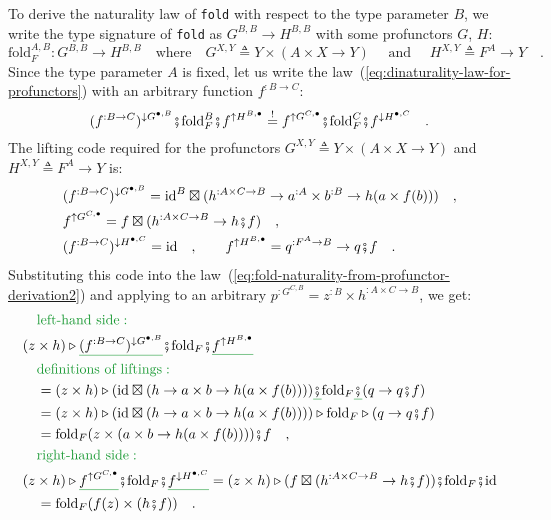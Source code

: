 To derive the naturality law of \lstinline!fold! with respect to
the type parameter $B$, we write the type signature of \lstinline!fold!
as $G^{B,B}\rightarrow H^{B,B}$ with some profunctors $G$, $H$:
\[
\text{fold}_{F}^{A,B}:G^{B,B}\rightarrow H^{B,B}\quad\text{where}\quad G^{X,Y}\triangleq Y\times(A\times X\rightarrow Y)\quad\text{ and }\quad H^{X,Y}\triangleq F^{A}\rightarrow Y\quad.
\]
Since the type parameter $A$ is fixed, let us write the law~(\ref{eq:dinaturality-law-for-profunctors})
with an arbitrary function $f^{:B\rightarrow C}$:
\begin{equation}
(f^{:B\rightarrow C})^{\downarrow G^{\bullet,B}}\bef\text{fold}_{F}^{B}\bef f^{\uparrow H^{B,\bullet}}\overset{!}{=}f^{\uparrow G^{C,\bullet}}\bef\text{fold}_{F}^{C}\bef f^{\downarrow H^{\bullet,C}}\quad.\label{eq:fold-naturality-from-profunctor-derivation2}
\end{equation}
The lifting code required for the profunctors $G^{X,Y}\triangleq Y\times\left(A\times X\rightarrow Y\right)$
and $H^{X,Y}\triangleq F^{A}\rightarrow Y$ is:
\begin{align*}
 & (f^{:B\rightarrow C})^{\downarrow G^{\bullet,B}}=\text{id}^{B}\boxtimes(h^{:A\times C\rightarrow B}\rightarrow a^{:A}\times b^{:B}\rightarrow h(a\times f(b)))\quad,\\
 & f^{\uparrow G^{C,\bullet}}=f\boxtimes(h^{:A\times C\rightarrow B}\rightarrow h\bef f)\quad,\\
 & (f^{:B\rightarrow C})^{\downarrow H^{\bullet,C}}=\text{id}\quad,\quad\quad f^{\uparrow H^{B,\bullet}}=q^{:F^{A}\rightarrow B}\rightarrow q\bef f\quad.
\end{align*}
Substituting this code into the law~(\ref{eq:fold-naturality-from-profunctor-derivation2})
and applying to an arbitrary $p^{:G^{C,B}}=z^{:B}\times h^{:A\times C\rightarrow B}$,
we get:
\begin{align*}
 & \quad{\color{greenunder}\text{left-hand side}:}\quad\\
 & (z\times h)\triangleright\gunderline{(f^{:B\rightarrow C})^{\downarrow G^{\bullet,B}}}\bef\text{fold}_{F}\bef\gunderline{f^{\uparrow H^{B,\bullet}}}\\
 & \quad{\color{greenunder}\text{definitions of liftings}:}\quad\\
 & \quad=(z\times h)\triangleright(\text{id}\boxtimes(h\rightarrow a\times b\rightarrow h(a\times f(b))))\gunderline{\bef}\text{fold}_{F}\gunderline{\bef}(q\rightarrow q\bef f)\\
 & \quad=(z\times h)\triangleright(\text{id}\boxtimes(h\rightarrow a\times b\rightarrow h(a\times f(b))))\triangleright\text{fold}_{F}\triangleright(q\rightarrow q\bef f)\\
 & \quad=\text{fold}_{F}(z\times(a\times b\rightarrow h(a\times f(b))))\bef f\quad,\\
 & \quad{\color{greenunder}\text{right-hand side}:}\quad\\
 & (z\times h)\triangleright\gunderline{f^{\uparrow G^{C,\bullet}}}\bef\text{fold}_{F}\bef\gunderline{f^{\downarrow H^{\bullet,C}}}=(z\times h)\triangleright(f\boxtimes(h^{:A\times C\rightarrow B}\rightarrow h\bef f))\bef\text{fold}_{F}\bef\text{id}\\
 & \quad=\text{fold}_{F}(f(z)\times(h\bef f))\quad.
\end{align*}
